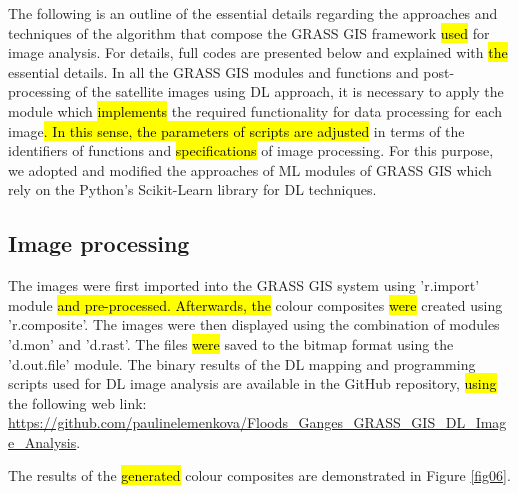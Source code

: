 \documentclass[water,article,submit,pdftex,moreauthors]{Definitions/mdpi}
\begin{document}
The following is an outline of the essential details regarding the approaches and techniques of the algorithm that compose the GRASS GIS framework \hl{used} for image analysis. For details, full codes are presented below and explained with \hl{the} essential details. In all the GRASS GIS modules and functions and post-processing of the satellite images using DL approach, it is necessary to apply the module which \hl{implements} the required functionality for data processing for each image\hl{. In this sense, the parameters of scripts are adjusted }in terms of the identifiers of functions and \hl{specifications} of image processing. For this purpose, we adopted and modified the approaches of ML modules\hl{ }of GRASS GIS which rely on\hl{ }the Python's Scikit-Learn library for DL techniques.

\subsection{Image processing}
The images were first imported into the GRASS GIS system using 'r.import' module\hl{ and pre-processed. Afterwards, the }colour composites \hl{were} created using 'r.composite'. The images were then displayed using the combination of modules 'd.mon' and 'd.rast'. The files \hl{were} saved to the bitmap format using the 'd.out.file' module. The binary results of the DL mapping and programming scripts used for DL image analysis are available in the GitHub repository, \hl{using} the following web link: \\
\href{https://github.com/paulinelemenkova/Floods_Ganges_GRASS_GIS_DL_Image_Analysis}{https://github.com/paulinelemenkova/Floods\_Ganges\_GRASS\_GIS\_DL\_Image\_Analysis}.

The results of the \hl{generated }colour composites are demonstrated in Figure \ref{fig06}. 
\end{document}
